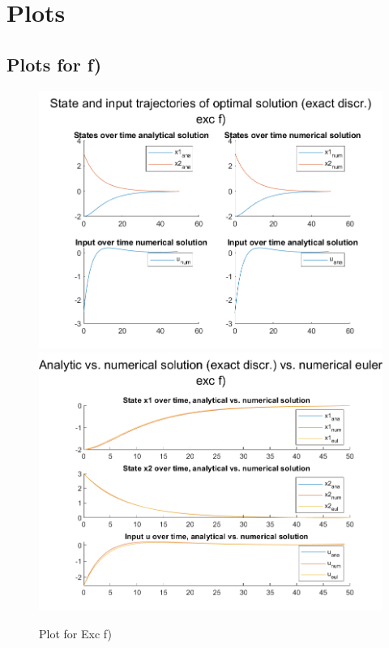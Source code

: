 \documentclass[]{article}
\begin{document}
\section{Plots} \label{sec:plots}

\subsection{Plots for f)}
\begin{figure}[H]
	\centering
	\includegraphics[width=0.95\linewidth]{plots/exc_f1.png}
	\includegraphics[width=0.95\linewidth]{plots/exc_f2.png}
	\caption{Plot for Exc f)}
	\label{fig:excf1}
\end{figure}
\end{document}
